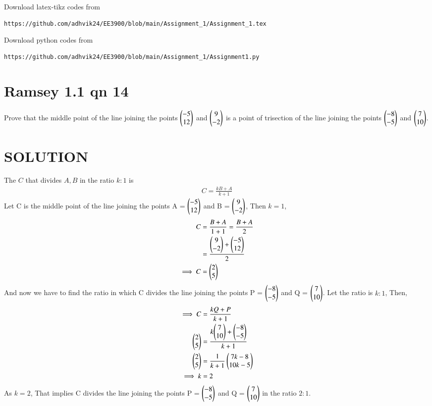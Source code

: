 \documentclass[journal,12pt,twocolumn]{IEEEtran}
\begin{document}
%
Download latex-tikz codes from 
%
\begin{lstlisting}
https://github.com/adhvik24/EE3900/blob/main/Assignment_1/Assignment_1.tex
\end{lstlisting}
%
Download python codes from 
%
\begin{lstlisting}
https://github.com/adhvik24/EE3900/blob/main/Assignment_1/Assignment1.py
\end{lstlisting}
\section{Ramsey 1.1 qn 14}
Prove that the middle point of the line joining the points $\begin{pmatrix}-5\\12\end{pmatrix}$ and $\begin{pmatrix}9\\-2\end{pmatrix}$ is a point of trisection of the line
joining the points $\begin{pmatrix}-8\\-5\end{pmatrix}$ and $\begin{pmatrix}7\\10\end{pmatrix}$.
\section{SOLUTION}
The ${C}$ that divides ${A},{B}$ in the ratio $k:1$ is
\begin{align}
{C}=\frac{k{B}+{A}}{k+1}\label{0}
\end{align}
Let C is the middle point of the line joining the points A = $\begin{pmatrix}-5\\12\end{pmatrix}$ and B = $\begin{pmatrix}9\\-2\end{pmatrix}$, Then $k=1$,
\begin{align}
    {C}&=\frac{{B}+{A}}{1+1}=\frac{{B}+{A}}{2}\\
    &= \frac{\begin{pmatrix}9\\-2\end{pmatrix}+\begin{pmatrix}-5\\12\end{pmatrix}}{2}\\
    \implies {C}&= \begin{pmatrix}2\\5\end{pmatrix}
\end{align}
And now we have to find the ratio in which C divides the line
joining the points P = $\begin{pmatrix}-8\\-5\end{pmatrix}$ and Q = $\begin{pmatrix}7\\10\end{pmatrix}$. Let the ratio is $k:1$,
Then,
\begin{align}
    \implies {C}&=\frac{k{Q}+{P}}{k+1}\\
    \begin{pmatrix}2\\5\end{pmatrix} &= \frac{{k{\begin{pmatrix}7\\10\end{pmatrix}+\begin{pmatrix}-8\\-5\end{pmatrix}}}}{k+1}\\
    \begin{pmatrix}2\\5\end{pmatrix}&=\frac{1}{k+1} \begin{pmatrix}7k-8\\10k-5\end{pmatrix}\\
    \implies k &= 2
\end{align}
As $k=2$, That implies C divides the line
joining the points P = $\begin{pmatrix}-8\\-5\end{pmatrix}$ and Q = $\begin{pmatrix}7\\10\end{pmatrix}$ in the ratio $2:1$.
\end{document}
